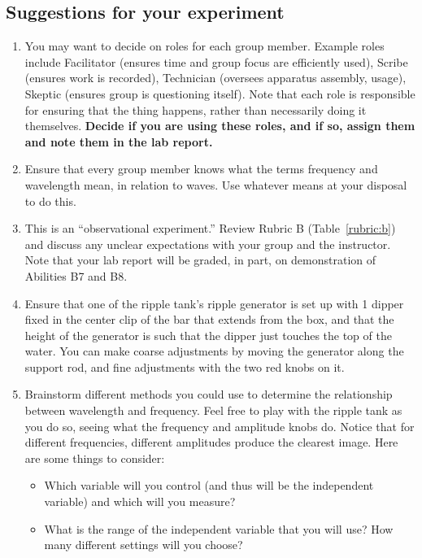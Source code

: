 \subsection{Suggestions for your experiment}

\begin{enumerate}
	\item You may want to decide on roles for each group member. Example roles include Facilitator (ensures time and group focus are efficiently used), Scribe (ensures work is recorded), Technician (oversees apparatus assembly, usage), Skeptic (ensures group is questioning itself). Note that each role is responsible for ensuring that the thing happens, rather than necessarily doing it themselves. \textbf{Decide if you are using these roles, and if so, assign them and note them in the lab report.}
	
	\item Ensure that every group member knows what the terms frequency and wavelength mean, in relation to waves. Use whatever means at your disposal to do this.
	
	\item This is an ``observational experiment.'' Review Rubric B (Table~\ref{rubric:b}) and discuss any unclear expectations with your group and the instructor. Note that your lab report will be graded, in part, on demonstration of Abilities B7 and B8.
	
	\item Ensure that one of the ripple tank's ripple generator is set up with 1 dipper fixed in the center clip of the bar that extends from the box, and that the height of the generator is such that the dipper just touches the top of the water. You can make coarse adjustments by moving the generator along the support rod, and fine adjustments with the two red knobs on it.
	
	\item Brainstorm different methods you could use to determine the relationship between wavelength and frequency. Feel free to play with the ripple tank as you do so, seeing what the frequency and amplitude knobs do. Notice that for different frequencies, different amplitudes produce the clearest image. Here are some things to consider:
	\begin{itemize}
		\item Which variable will you control (and thus will be the independent variable) and which will you measure?
		
		\item What is the range of the independent variable that you will use? How many different settings will you choose?
		

\end{itemize}
\end{enumerate}

